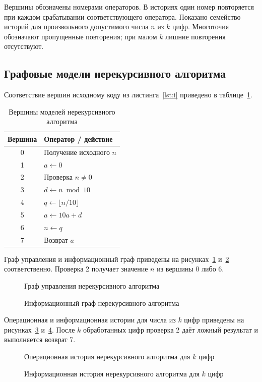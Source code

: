 \documentclass[14pt,a4paper]{extarticle}
\newcommand{\fig}[3]{\begin{figure}[H]\centering\caption{#2}\label{#3}\end{figure}}
\numberwithin{equation}{section}
\numberwithin{figure}{section}
\numberwithin{table}{section}
\begin{document}
Вершины обозначены номерами операторов. В историях один номер повторяется при каждом срабатывании соответствующего оператора. Показано семейство историй для произвольного допустимого числа $n$ из $k$ цифр. Многоточия обозначают пропущенные повторения; при малом $k$ лишние повторения отсутствуют.

\subsection{Графовые модели нерекурсивного алгоритма}
Соответствие вершин исходному коду из листинга~\ref{lst:i} приведено в таблице~\ref{tab:inodes}.
\begin{table}[H]\centering\caption{Вершины моделей нерекурсивного алгоритма}\label{tab:inodes}
\small\begin{tabularx}{\textwidth}{|c|>{\raggedright\arraybackslash}X|}\hline
\bfseries Вершина & \bfseries Оператор / действие\\\hline
0 & Получение исходного $n$\\\hline
1 & $a\gets0$\\\hline
2 & Проверка $n\ne0$\\\hline
3 & $d\gets n\bmod10$\\\hline
4 & $q\gets\lfloor n/10\rfloor$\\\hline
5 & $a\gets10a+d$\\\hline
6 & $n\gets q$\\\hline
7 & Возврат $a$\\\hline
\end{tabularx}\end{table}

Граф управления и информационный граф приведены на рисунках~\ref{fig:ic} и~\ref{fig:ii} соответственно. Проверка 2 получает значение $n$ из вершины 0 либо 6.
\fig{iter_control}{Граф управления нерекурсивного алгоритма}{fig:ic}
\fig{iter_information}{Информационный граф нерекурсивного алгоритма}{fig:ii}

Операционная и информационная истории для числа из $k$ цифр приведены на рисунках~\ref{fig:io} и~\ref{fig:id}. После $k$ обработанных цифр проверка 2 даёт ложный результат и выполняется возврат 7.
\fig{iter_operational}{Операционная история нерекурсивного алгоритма для $k$ цифр}{fig:io}
\fig{iter_dynamic}{Информационная история нерекурсивного алгоритма для $k$ цифр}{fig:id}
\end{document}
